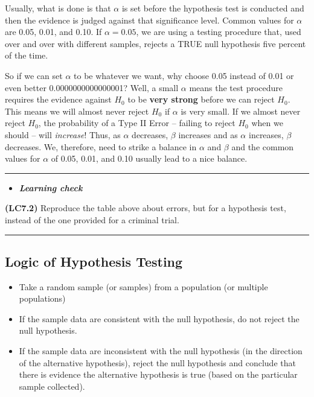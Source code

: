 \documentclass[]{tufte-book}
\let\oldrule=\rule
\renewcommand{\rule}[1]{\oldrule{\linewidth}}
\providecommand{\tightlist}{%
  \setlength{\itemsep}{0pt}\setlength{\parskip}{0pt}}
\newenvironment{rmdblock}[1]
  {\begin{shaded*}
  \begin{itemize}
  \renewcommand{\labelitemi}{
    \raisebox{-.7\height}[0pt][0pt]{
    }
  }
  \item
  }
  {
  \end{itemize}
  \end{shaded*}
  }
\newenvironment{learncheck}
  {\begin{rmdblock}{warning}}
  {\end{rmdblock}}
\theoremstyle{definition}
\theoremstyle{definition}
\theoremstyle{remark}
\begin{document}
Usually, what is done is that \(\alpha\) is set before the hypothesis
test is conducted and then the evidence is judged against that
significance level. Common values for \(\alpha\) are 0.05, 0.01, and
0.10. If \(\alpha = 0.05\), we are using a testing procedure that, used
over and over with different samples, rejects a TRUE null hypothesis
five percent of the time.

So if we can set \(\alpha\) to be whatever we want, why choose 0.05
instead of 0.01 or even better 0.0000000000000001? Well, a small
\(\alpha\) means the test procedure requires the evidence against
\(H_0\) to be \textbf{very strong} before we can reject \(H_0\). This
means we will almost never reject \(H_0\) if \(\alpha\) is very small.
If we almost never reject \(H_0\), the probability of a Type II Error --
failing to reject \(H_0\) when we should -- will \emph{increase}! Thus,
as \(\alpha\) decreases, \(\beta\) increases and as \(\alpha\)
increases, \(\beta\) decreases. We, therefore, need to strike a balance
in \(\alpha\) and \(\beta\) and the common values for \(\alpha\) of
0.05, 0.01, and 0.10 usually lead to a nice balance.

\begin{center}\rule{0.5\linewidth}{\linethickness}\end{center}

\begin{learncheck}
\textbf{\emph{Learning check}}
\end{learncheck}

\textbf{(LC7.2)} Reproduce the table above about errors, but for a
hypothesis test, instead of the one provided for a criminal trial.

\begin{center}\rule{0.5\linewidth}{\linethickness}\end{center}

\subsection{Logic of Hypothesis
Testing}\label{logic-of-hypothesis-testing}

\begin{itemize}
\tightlist
\item
  Take a random sample (or samples) from a population (or multiple
  populations)
\item
  If the sample data are consistent with the null hypothesis, do not
  reject the null hypothesis.
\item
  If the sample data are inconsistent with the null hypothesis (in the
  direction of the alternative hypothesis), reject the null hypothesis
  and conclude that there is evidence the alternative hypothesis is true
  (based on the particular sample collected).
\end{itemize}
\end{document}

